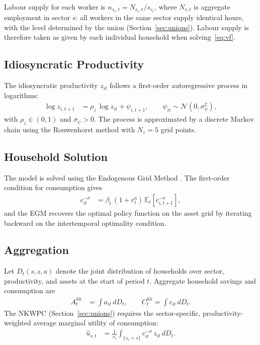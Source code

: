 \documentclass[12pt,a4paper]{article}
\newcommand{\E}{\mathbb{E}}
\newcommand{\dD}{\,dD_t}
\begin{document}
Labour supply for each worker is $n_{s_i,t} = N_{s_i,t}/s_{s_i}$, where $N_{s,t}$ is aggregate employment in sector $s$: all workers in the same sector supply identical hours, with the level determined by the union (Section~\ref{sec:unions}). Labour supply is therefore taken as given by each individual household when solving~\eqref{eq:vf}.

\subsection{Idiosyncratic Productivity}

The idiosyncratic productivity $z_{it}$ follows a first-order autoregressive process in logarithms:
\begin{align}
    \log z_{i,t+1} &= \rho_z\,\log z_{it} + \psi_{i,t+1}, \qquad
    \psi_{it} \sim \mathcal{N}(0,\sigma_\psi^2),
    \label{eq:productivity}
\end{align}
with $\rho_z \in (0,1)$ and $\sigma_\psi > 0$. The process is approximated by a discrete Markov chain using the Rouwenhorst \citeyearpar{rouwenhorst_1995} method with $N_z = 5$ grid points.

\subsection{Household Solution}

The model is solved using the Endogenous Grid Method \citep[EGM,][]{carroll_2006}. The first-order condition for consumption gives
\begin{align}
    c_{it}^{-\sigma} &= \beta_t\,(1 + r^a_t)\,\E_t\!\left[c_{i,t+1}^{-\sigma}\right],
\end{align}
and the EGM recovers the optimal policy function on the asset grid by iterating backward on the intertemporal optimality condition.

\subsection{Aggregation}

Let $D_t(s,z,a)$ denote the joint distribution of households over sector, productivity, and assets at the start of period $t$. Aggregate household savings and consumption are
\begin{align}
    A^{hh}_t &= \int a_{it}\dD, \qquad
    C^{hh}_t = \int c_{it}\dD.
    \label{eq:aggregates_hh}
\end{align}
The NKWPC (Section~\ref{sec:unions}) requires the sector-specific, productivity-weighted average marginal utility of consumption:
\begin{align}
    \hat{u}_{s,t} &= \frac{1}{s_s}
        \int_{\{s_i = s\}} c_{it}^{-\sigma}\,z_{it}\dD.
    \label{eq:MUC_s}
\end{align}
\end{document}
